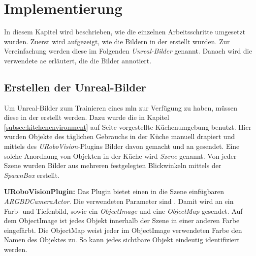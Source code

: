 \graphicspath{{./images/}}      
\def\CHAPTERONE{./chapters/Chapter-1} 

\chapter{Implementierung}
\label{chap:implementation}
%	

In diesem Kapitel wird beschrieben, wie die einzelnen Arbeitsschritte umgesetzt wurden. Zuerst wird aufgezeigt, wie die Bildern in der \unreal erstellt wurden. Zur Vereinfachung werden diese  im Folgenden \textit{Unreal-Bilder} genannt. Danach wird die verwendete \gls{ae} erläutert, die die Bilder annotiert. 

\section{Erstellen der Unreal-Bilder}
\label{sec:takingpics}
Um Unreal-Bilder zum Trainieren eines \gls{mln} zur Verfügung zu haben, müssen diese in der \unreal erstellt werden. Dazu wurde die in Kapitel \ref{subsec:kitchenenvironment} auf Seite \pageref{subsec:kitchenenvironment} vorgestellte Küchenumgebung benutzt. Hier wurden Objekte des täglichen Gebrauchs in der Küche manuell drapiert und mittels des \textit{URoboVision}-Plugins Bilder davon gemacht und an \robosherlock gesendet. Eine solche Anordnung von Objekten in der Küche wird \textit{Szene} genannt. Von jeder Szene wurden Bilder aus mehreren festgelegten Blickwinkeln mittels der \textit{SpawnBox} erstellt. \par 

\textbf{URoboVisionPlugin:} Das Plugin bietet einen in die Szene einfügbaren \textit{ARGBDCameraActor}. Die verwendeten Parameter sind . Damit wird an \robosherlock ein Farb- und Tiefenbild, sowie ein \textit{ObjectImage} und eine \textit{ObjectMap} gesendet. Auf dem ObjectImage ist jedes Objekt innerhalb der Szene in einer anderen Farbe eingefärbt. Die ObjectMap weist jeder im ObjectImage verwendeten Farbe den Namen des Objektes zu. So kann jedes sichtbare Objekt eindeutig identifiziert werden.   \par 

